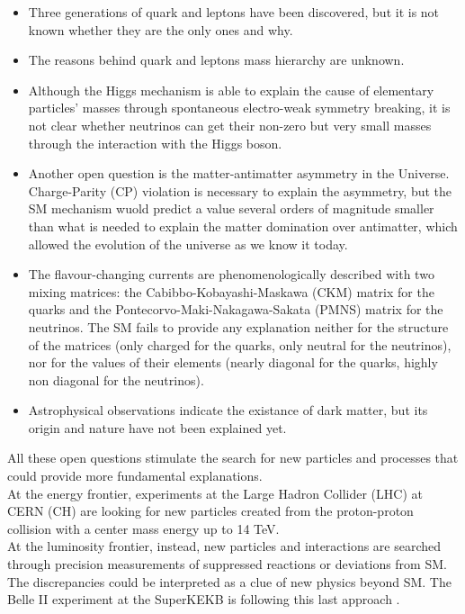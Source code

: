 \begin{itemize}
\item Three generations of quark and leptons have been discovered, but it is not known whether they are the only ones and why.
\item The reasons behind quark and leptons mass hierarchy are unknown.
\item Although the Higgs mechanism is able to explain the cause of elementary particles' masses through spontaneous electro-weak symmetry breaking, it is not clear whether neutrinos can get their non-zero but very small masses through the interaction with the Higgs boson.
\item Another open question is the matter-antimatter asymmetry in the Universe. Charge-Parity (CP) violation is necessary to explain the asymmetry, but the SM mechanism wuold predict a value several orders of magnitude smaller than what is needed to explain the matter domination over antimatter, which allowed the evolution of the universe as we know it today.
\item The flavour-changing currents are phenomenologically described with two mixing matrices: the Cabibbo-Kobayashi-Maskawa (CKM) matrix for the quarks and the Pontecorvo-Maki-Nakagawa-Sakata (PMNS) matrix for the neutrinos. The SM fails to provide any explanation neither for the structure of the matrices (only charged for the quarks, only neutral for the neutrinos), nor for the values of their elements (nearly diagonal for the quarks, highly non diagonal for the neutrinos).
\item Astrophysical observations indicate the existance of dark matter, but its origin and nature have not been explained yet.
\end{itemize}

All these open questions stimulate the search for new particles and processes that could provide more fundamental explanations.\\
At the energy frontier, experiments at the Large Hadron Collider (LHC) at CERN (CH) are looking for new particles created from the proton-proton collision with a center mass energy up to 14 TeV.\\
At the luminosity frontier, instead, new particles and interactions are searched through precision measurements of suppressed reactions or deviations from SM. The discrepancies could be interpreted as a clue of new physics beyond SM. The Belle II experiment at the SuperKEKB is following this last approach .\\



